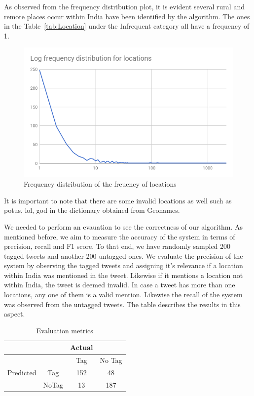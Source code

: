 \documentclass[journal, a4paper]{IEEEtran}
\begin{document}
As observed from the frequency distribution plot, it is evident several rural and remote places occur within India have been identified by the algorithm. The ones in the 
Table~\ref{tab:Location} under the Infrequent category all have a frequency of 1. 
\begin{figure}[h]
	\begin{center}
		\includegraphics[scale=0.35]{location_freq}
		\caption{Frequency distribution of the freuency of locations }
		\label{fig:freq_dist}
	\end{center}
\end{figure}

It is important to note that there are some invalid locations as well such as potus,
lol, god in the dictionary obtained from Geonames.

We needed to perform an evauation to see the correctness of our algorithm. As mentioned before, we aim to measure the accuracy of the system in terms of precision, recall and F1 score. To that end, we have randomly sampled 200 tagged tweets and another 200 untagged ones. 
We evaluate the precision of the system by observing the tagged tweets and assigning it's relevance if a location within India was mentioned in the tweet. Likewise if it mentions a location not within India, the tweet is deemed invalid. In case a tweet has more than one locations, any one of them is a valid mention. 
Likewise the recall of the system was observed from the untagged tweets. 
The table describes the results in this aspect.

\begin{table}[!hbt]
	\begin{center}
		\caption{Evaluation metrics}
		\label{tab:Evaluation}
		\begin{tabular}{|c|c|c|c|}
			\hline
			
			&&Actual&\\\hline
			&&Tag&No Tag\\\hline
			Predicted&Tag&152&48\\
			&NoTag&13&187\\		
			\hline
		\end{tabular}
	\end{center}
\end{table}
\end{document}
